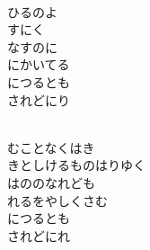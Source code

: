 \documentclass[10pt,b5j]{tarticle} %
\begin{document}
\begin{enumerate}
\begin{minipage}[c]{\blocksize}
    \end{minipage}
    \begin{minipage}[c]{\blocksize}
        
        \vspace{\linespace}
        \item~\\
        ひるのよ\\
        すにく\\
        なすのに\\
        にかいてる\\
        につるとも\\
        されどにり
        
    \end{minipage}
    \begin{minipage}[c]{\blocksize}
        
        \vspace{\linespace}
        \item~\\
        むことなくはき\\
        きとしけるものはりゆく\\
        はののなれども\\
        れるをやしくさむ\\
        につるとも\\
        されどにれ
    
    \end{minipage}
\end{enumerate} %
\end{document}
